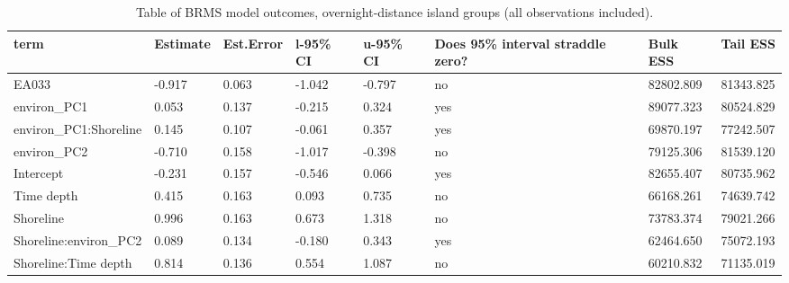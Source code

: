 \begin{table}[ht]
\centering
\begin{tabular}{p{5cm}p{2cm}p{2cm}p{2cm}p{2cm}p{2cm}p{2cm}p{2cm}}
  \toprule
term & Estimate & Est.Error & l-95\% CI & u-95\% CI & Does 95\% interval straddle zero? & Bulk ESS & Tail ESS \\ 
  \midrule
EA033 & -0.917 & 0.063 & -1.042 & -0.797 & no & 82802.809 & 81343.825 \\ 
  environ\_PC1 & 0.053 & 0.137 & -0.215 & 0.324 & yes & 89077.323 & 80524.829 \\ 
  environ\_PC1:Shoreline & 0.145 & 0.107 & -0.061 & 0.357 & yes & 69870.197 & 77242.507 \\ 
  environ\_PC2 & -0.710 & 0.158 & -1.017 & -0.398 & no & 79125.306 & 81539.120 \\ 
  Intercept & -0.231 & 0.157 & -0.546 & 0.066 & yes & 82655.407 & 80735.962 \\ 
  Time depth & 0.415 & 0.163 & 0.093 & 0.735 & no & 66168.261 & 74639.742 \\ 
  Shoreline & 0.996 & 0.163 & 0.673 & 1.318 & no & 73783.374 & 79021.266 \\ 
  Shoreline:environ\_PC2 & 0.089 & 0.134 & -0.180 & 0.343 & yes & 62464.650 & 75072.193 \\ 
  Shoreline:Time depth & 0.814 & 0.136 & 0.554 & 1.087 & no & 60210.832 & 71135.019 \\ 
   \bottomrule
\end{tabular}
\caption{Table of BRMS model outcomes, overnight-distance island groups (all observations included).} 
\label{BRMS_effects_SBZR}
\end{table}
